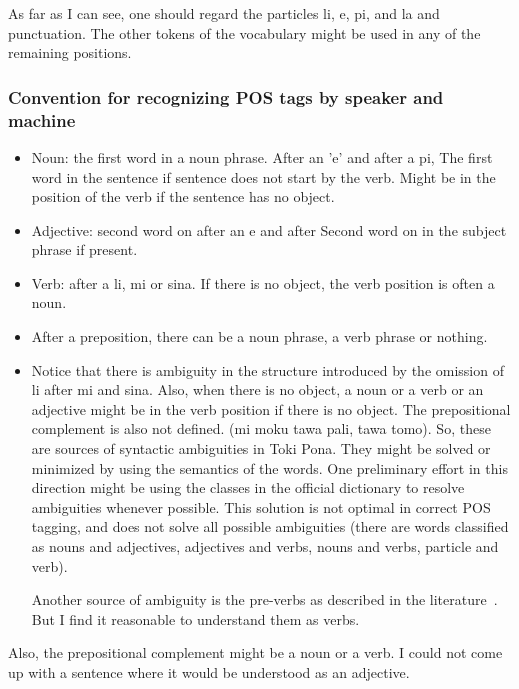 \documentclass{article}
\begin{document}
As far as I can see, one should regard
the particles li, e, pi, and la
and punctuation.
The other tokens of the vocabulary
might be used in any of the remaining positions.

\subsubsection{Convention for recognizing POS tags by speaker and machine}

\begin{itemize}
  \item Noun: the first word in a noun phrase.
    After an 'e' and after a pi,
    The first word in the sentence if
    sentence does not start by the verb.
    Might be in the position of the verb
    if the sentence has no object.
  \item Adjective: second word on after an e and after
    Second word on in the subject phrase if present.
  \item Verb: after a li, mi or sina.
    If there is no object, the verb position
    is often a noun.
  \item After a preposition,
    there can be a noun phrase, a verb phrase
    or nothing.
  \item Notice that there is ambiguity in the structure
    introduced by the omission of li after mi and sina.
    Also, when there is no object, a noun or a verb
    or an adjective might be in the verb position
    if there is no object.
    The prepositional complement is also not defined.
    (mi moku tawa pali, tawa tomo).
    So, these are sources of syntactic ambiguities
    in Toki Pona.
    They might be solved or minimized by using the semantics
    of the words.
    One preliminary effort in this direction might be
    using the classes in the official dictionary to resolve
    ambiguities whenever possible.
    This solution is not optimal in correct POS tagging,
    and does not solve all possible ambiguities
    (there are words classified as nouns and adjectives,
    adjectives and verbs, nouns and verbs, particle and verb).

    Another source of ambiguity is the pre-verbs as described
    in the literature~\cite{tpLang,pije}.
    But I find it reasonable to understand them as verbs.

\end{itemize}

Also, the prepositional complement might
be a noun or a verb.
I could not come up with a sentence
where it would be understood as an adjective.
\end{document}
